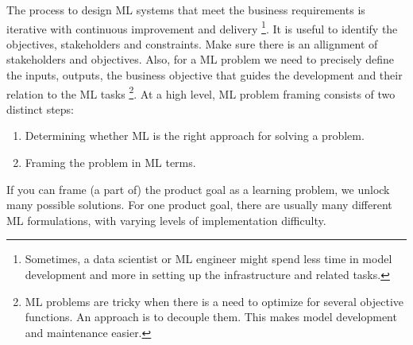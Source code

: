 The process to design ML systems that meet the business requirements
is iterative with continuous improvement and delivery
\footnote{
    Sometimes, a data scientist or ML engineer might spend less 
    time in model development and more in setting up the 
    infrastructure and related tasks.
}.
It is useful to identify the objectives, stakeholders and constraints.
Make sure there is an allignment of stakeholders and objectives.
Also, for a ML problem we need to precisely define the inputs,
outputs, the business objective that guides the development
and their relation to the ML tasks
\footnote{
    ML problems are tricky when there is a need to optimize for
    several objective functions. An approach is to decouple
    them. This makes model development and maintenance easier.
}.
At a high level, ML problem framing consists of two distinct steps: 
\begin{enumerate}
    \item Determining whether ML is the right approach for solving
    a problem.
    \item Framing the problem in ML terms.
\end{enumerate}
If you can frame (a part of) the product goal as a
learning problem, we unlock many possible solutions.
For one product goal, there are usually many different
ML formulations, with varying levels of implementation
difficulty.



